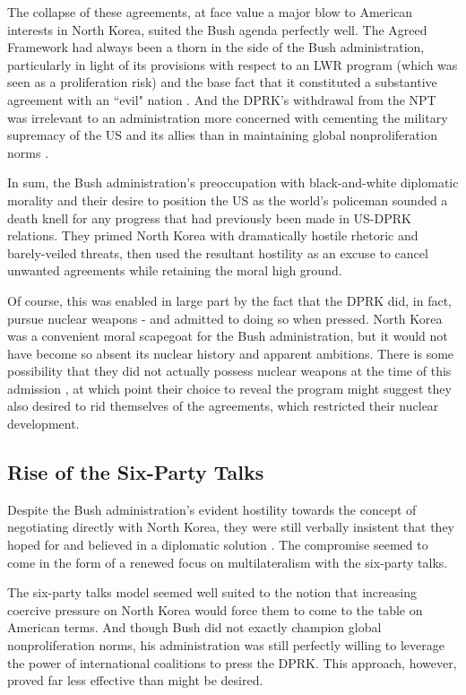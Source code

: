 The collapse of these agreements, at face value a major blow to American interests in North Korea, suited the Bush agenda perfectly well. The Agreed Framework had always been a thorn in the side of the Bush administration, particularly in light of its provisions with respect to an LWR program (which was seen as a proliferation risk) and the base fact that it constituted a substantive agreement with an ``evil" nation \cite{harnisch}. And the DPRK's withdrawal from the NPT was irrelevant to an administration more concerned with cementing the military supremacy of the US and its allies than in maintaining global nonproliferation norms \cite{huntley}.

In sum, the Bush administration's preoccupation with black-and-white diplomatic morality and their desire to position the US as the world's policeman sounded a death knell for any progress that had previously been made in US-DPRK relations. They primed North Korea with dramatically hostile rhetoric and barely-veiled threats, then used the resultant hostility as an excuse to cancel unwanted agreements while retaining the moral high ground.

Of course, this was enabled in large part by the fact that the DPRK did, in fact, pursue nuclear weapons - and admitted to doing so when pressed. North Korea was a convenient moral scapegoat for the Bush administration, but it would not have become so absent its nuclear history and apparent ambitions. There is some possibility that they did not actually possess nuclear weapons at the time of this admission \cite{harnisch}, at which point their choice to reveal the program might suggest they also desired to rid themselves of the agreements, which restricted their nuclear development. 

\subsection{Rise of the Six-Party Talks}

Despite the Bush administration's evident hostility towards the concept of negotiating directly with North Korea, they were still verbally insistent that they hoped for and believed in a diplomatic solution \cite{bleiker}. The compromise seemed to come in the form of a renewed focus on multilateralism with the six-party talks.

The six-party talks model seemed well suited to the notion that increasing coercive pressure on North Korea would force them to come to the table on American terms. And though Bush did not exactly champion global nonproliferation norms, his administration was still perfectly willing to leverage the power of international coalitions to press the DPRK. This approach, however, proved far less effective than might be desired.

